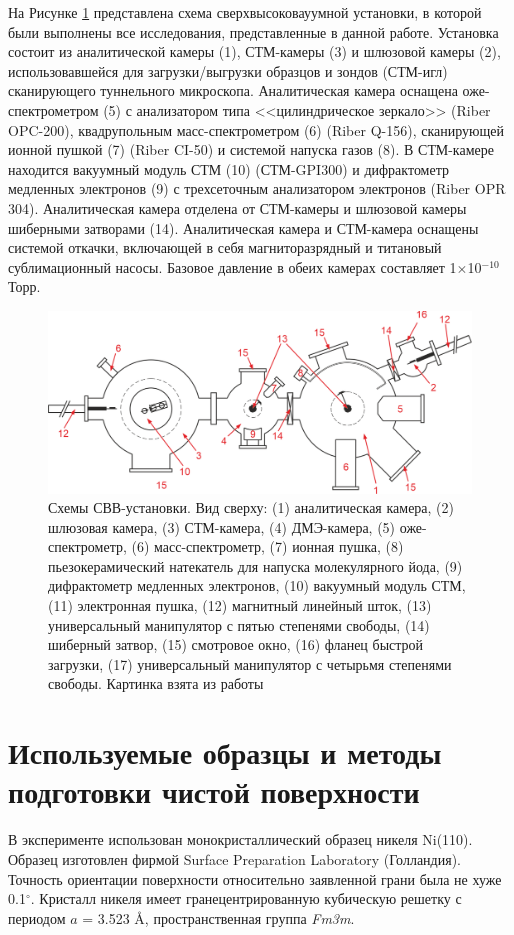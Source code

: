 \documentclass[a4paper,12pt]{article}
\theoremstyle{plain} %
\theoremstyle{definition} %
\theoremstyle{remark} %
\begin{document}
На Рисунке \ref{fig:1_setup} представлена схема сверхвысоковауумной установки, в которой были выполнены все исследования, представленные в данной работе.
Установка состоит из аналитической камеры (1),  СТМ-камеры (3) и шлюзовой камеры (2), использовавшейся для загрузки/выгрузки  образцов  и  зондов (СТМ-игл) сканирующего туннельного микроскопа. Аналитическая камера оснащена оже-спектрометром (5) с анализатором типа <<цилиндрическое зеркало>> (Riber OPC-200), квадрупольным масс-спектрометром (6) (Riber Q-156), сканирующей ионной пушкой (7) (Riber CI-50) и системой напуска газов (8). В СТМ-камере находится вакуумный модуль СТМ (10) (СТМ-GPI300) и дифрактометр медленных электронов (9) с трехсеточным анализатором электронов (Riber OPR 304). Аналитическая камера отделена
от СТМ-камеры  и шлюзовой камеры шиберными затворами (14).  Аналитическая камера и СТМ-камера оснащены системой откачки,
включающей в себя магниторазрядный и титановый сублимационный насосы. Базовое давление в обеих камерах составляет 1$\times$10$^{-10}$ Торр.

 \begin{figure}[t] %
    \centerline{\includegraphics[width=14cm]{Setup.png}}
    \caption{Схемы СВВ-установки. Вид сверху: (1) аналитическая камера, (2) шлюзовая камера, (3) СТМ-камера, (4) ДМЭ-камера, (5) оже-спектрометр, (6) масс-спектрометр, (7) ионная пушка, (8) пьезокерамический натекатель для напуска молекулярного йода, (9) дифрактометр медленных электронов, (10) вакуумный модуль СТМ, (11) электронная пушка, (12) магнитный линейный шток, (13) универсальный манипулятор с пятью степенями свободы, (14) шиберный затвор, (15) смотровое окно, (16) фланец быстрой загрузки, (17) универсальный манипулятор с четырьмя степенями свободы. Картинка взята из работы \cite{Nikita}}
    \label{fig:1_setup}
 \end{figure}

\section{Используемые образцы и методы подготовки чистой поверхности}
 В эксперименте использован монокристаллический образец никеля  Ni(110). Образец изготовлен фирмой Surface Preparation Laboratory (Голландия).
Точность ориентации поверхности относительно заявленной грани была не хуже 0.1$^{\circ}$. Кристалл никеля имеет гранецентрированную кубическую
решетку с периодом $a$ = 3.523 \AA, пространственная группа \emph{Fm3m}.
\end{document}

